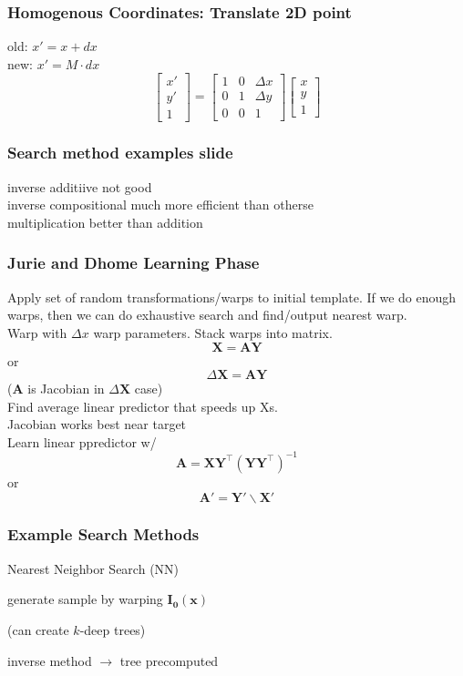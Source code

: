 \documentclass{article}
\begin{document}
\subsubsection{Homogenous Coordinates: Translate 2D point}
old: $x' = x + dx$
\\
new: $x' = M\cdot dx$
\[
    \begin{bmatrix}
        x' \\ y' \\ 1
    \end{bmatrix}
    = \begin{bmatrix}
        1 & 0 & \Delta x\\
        0 & 1 & \Delta y \\
        0 & 0 & 1
    \end{bmatrix}
    \begin{bmatrix}
        x\\y\\1
    \end{bmatrix}
\]

\subsubsection{Search method examples slide}
inverse additiive not good
\\
inverse compositional much more efficient than otherse
\\
multiplication better than addition


\subsubsection{Jurie and Dhome Learning Phase}
Apply set of random transformations/warps to initial template. If we do enough warps, then we can do exhaustive search and find/output nearest warp.\\
Warp with $\Delta x$ warp parameters. Stack warps into matrix.
\[
    \mathbf{X} = \mathbf{AY}
\]
or
\[
    \Delta \mathbf{X} = \mathbf{AY}
\] ($\mathbf A$ is Jacobian in $\Delta \mathbf X$ case)
\\
Find average linear predictor that speeds up Xs.
\\
Jacobian works best near target
\\
Learn linear ppredictor w/
\[
    \mathbf A = \mathbf{XY}^\top (\mathbf{YY}^\top)^{-1}
\]
or \[
    \mathbf{A}' = \mathbf{Y}'\backslash\mathbf{X}'
\]


\subsubsection{Example Search Methods}
Nearest Neighbor Search (NN)
\begin{list}{}{}
    \item generate sample by warping $\mathbf{I_0(x)}$
    \item (can create $k$-deep trees)
    \item inverse method $\to$ tree precomputed 
\end{list}
\end{document}
